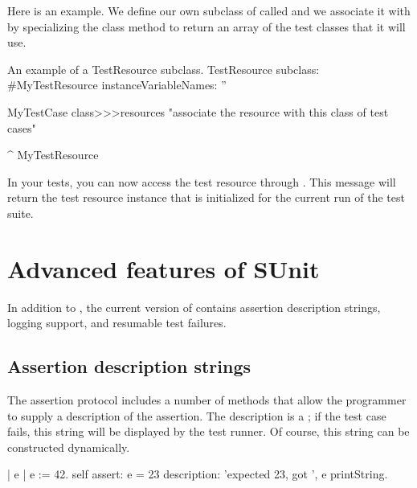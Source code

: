 \documentclass[a4paper,10pt,twoside]{book}
\begin{document}
Here is an example.
We define our own subclass of  called  and we associate it with  by specializing the class method  to return an array of the test classes that it will use.

\begin{classdef}[mytestresource]{An example of a TestResource subclass.}
TestResource subclass: #MyTestResource
	instanceVariableNames: ''

MyTestCase class>>>resources
	"associate the resource with this class of test cases"

	^ {MyTestResource}
\end{classdef}

In your tests, you can now access the test resource through .
This message will return the test resource instance that is initialized for the current run of the test suite.





\section{Advanced features of SUnit}
In addition to , the current version of \sunit contains assertion description strings, logging support, and resumable test failures.

\subsection{Assertion description strings}
\label{sec:descriptionStrings}

The  assertion protocol includes a number of methods that allow the programmer to supply a description of the assertion.
The description is a ; if the test case fails, this string will be displayed by the test runner.
Of course, this string can be constructed dynamically.
\begin{code}{}
| e |
e := 42.
self
  assert: e = 23
  description: 'expected 23, got ', e printString.
\end{code}
\end{document}
